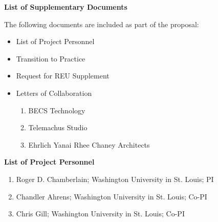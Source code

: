 \documentclass[11pt]{article}
\begin{document}
\pagestyle{empty}
\thispagestyle{empty}

\begin{center}
\textbf{\Large List of Supplementary Documents}
\end{center}

The following documents are included as part of the proposal:

\begin{itemize}

\item List of Project Personnel

\item Transition to Practice

\item Request for REU Supplement

\item Letters of Collaboration

\begin{enumerate}

\item BECS Technology

\item Telemachus Studio

\item Ehrlich Yanai Rhee Chaney Architects

\end{enumerate}

\end{itemize}

\newpage

\begin{center}
\textbf{\Large List of Project Personnel}
\end{center}

\begin{enumerate}

\item Roger D. Chamberlain; Washington University in St. Louis; PI

\item Chandler Ahrens; Washington University in St. Louis; Co-PI

\item Chris Gill; Washington University in St. Louis; Co-PI

\end{enumerate}
\end{document}
